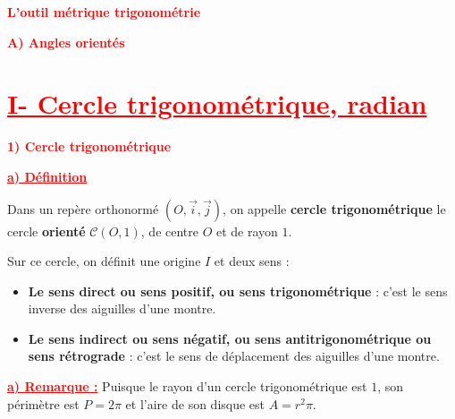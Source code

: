 \documentclass{article}
\begin{document}
\begin{center}
    \textcolor{red}{\textbf{L’outil métrique trigonométrie}}
\end{center}

\textcolor{red}{\textbf{A) Angles orientés}}  

\section*{\textcolor{red}{\textbf{\uline{I- Cercle trigonométrique, radian}}}}  

\vspace{0.5cm}

\textcolor{red}{\textbf{1) Cercle trigonométrique}}  

\vspace{0.3cm}

\textcolor{red}{\textbf{\underline{a) Définition}}}  

Dans un repère orthonormé $(O, \vec{i}, \vec{j})$, on appelle \textbf{cercle trigonométrique} le cercle \textbf{orienté} $\mathcal{C}(O,1)$, de centre $O$ et de rayon $1$. 

Sur ce cercle, on définit une origine $I$ et deux sens :

\begin{itemize}
    \item \textbf{Le sens direct ou sens positif, ou sens trigonométrique} : c'est le sens inverse des aiguilles d'une montre.
    \item \textbf{Le sens indirect ou sens négatif, ou sens antitrigonométrique ou sens rétrograde} : c'est le sens de déplacement des aiguilles d'une montre.
\end{itemize}

\textcolor{red}{\textbf{\underline{a) Remarque :}}} Puisque le rayon d’un cercle trigonométrique est $1$, son périmètre est $P = 2\pi $
et l’aire de son disque est $A = r^{2}\pi.$

\begin{center}
\end{center}
\end{document}
